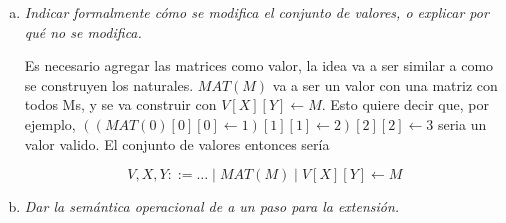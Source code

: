 \documentclass[10pt, a4paper]{article}
\newcommand{\abs}[3]{\ensuremath{\lambda#1:#2.#3}}
\newcommand{\tipa}[3]{#1 \ \rhd \ #2 : #3}
\newcommand{\Gtipa}[2]{\tipa{\Gamma}{#1}{#2}}
\newcommand{\MatInf}[1]{\text{MatInf}_{#1}}
\newcommand{\MatGet}[3]{#1[#2][#3]}
\newcommand{\MatSet}[4]{\MatGet{#1}{#2}{#3} \leftarrow #4}
\begin{document}
\begin{enumerate}[a)]
\[
    \trfrac[(T-MatMap)]
    {
        \trfrac[(T-MatSet)]
        {
            \begin{trgather}
            \trfrac[(T-Var)]
            {
                \trfrac[]
                {\checkmark}
                {
                    m:\MatInf{Nat} \in \Gamma
                }
            }
            {
                \Gtipa{m}{\MatInf{Nat}}
            }
            \\
            \trfrac[(T-Var)]
            {
                \trfrac[]
                {\checkmark}
                {
                    i:Nat \in \Gamma
                }
            }
            {
                \Gtipa{i}{Nat}
            }
            \qquad\qquad\qquad\quad
            \trfrac[(T-Zero)]
            {\checkmark}
            {
                \Gtipa{0}{Nat}
            }
            \end{trgather}
        }
        {
            \Gtipa{\MatSet{m}{i}{i}{0}}{\MatInf{Nat}}
        }
        \quad
        \trfrac[(T-Abs)]
        {
            \trfrac[(T-IsZero)]
            {
                \trfrac[(T-Var)]
                {
                    \trfrac[]
                    {\checkmark}
                    {
                        x:Nat \in \Gamma \cup \{x:Nat\}   
                    }
                }
                {
                    \tipa{\Gamma \cup \{x:Nat\}}{x}{Nat}
                }
            }
            {
                \tipa{\Gamma \cup \{x:Nat\}}{isZero(x)}{Bool}
            }
        }
        {
            \Gtipa{\abs{x}{Nat}{isZero(x)}}{Nat \rightarrow Bool}
        }
    }
    {
        \tipa
        {\Gamma = \{i: Nat, m: \MatInf{Nat}\}}
        {map((\MatSet{m}{i}{i}{0}), \abs{x}{Nat}{isZero(x)})}
        {\MatInf{Bool}}
    } 
\]

\item \textit{Indicar formalmente cómo se modifica el conjunto de valores, o explicar
por qué no se modifica.}

    Es necesario agregar las matrices como valor, la idea va a ser similar a como se
    construyen los naturales. $MAT(M)$ va a ser un valor con una matriz con todos
    Ms, y se va construir con $\MatSet{V}{X}{Y}{M}$. Esto quiere decir que, por
    ejemplo, $\MatSet{(\MatSet{(\MatSet{MAT(0)}{0}{0}{1})}{1}{1}{2})}{2}{2}{3}$ seria un
    valor valido. El conjunto de valores entonces sería

    \[
        V, X, Y ::= \ldots \mid MAT(M) \mid \MatSet{V}{X}{Y}{M}
    \]

\item \textit{Dar la semántica operacional de a un paso para la extensión.}



\end{enumerate}
\end{document}
